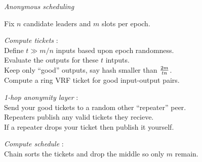 \documentclass{beamer}
\begin{document}
\begin{frame}[t]


\hspace{30pt} \emph{Anonymous scheduling} \\ \bigskip %

Fix $n$ candidate leaders and $m$ slots per epoch. \\ \smallskip

\emph{Compute tickets} : \\
\hspace{15pt} Define $t \gg m/n$ inputs based upon epoch randomness. \\ \smallskip
\hspace{15pt} Evaluate the outputs for these $t$ intputs. \\ \smallskip
\hspace{15pt} Keep only ``good'' outputs, say hash smaller than $2 m \over t n$.  \\ \smallskip
\hspace{15pt} Compute a ring VRF ticket for good input-output pairs. \\ \bigskip

\emph{1-hop anonymity layer} : \\
\hspace{5pt} Send your good tickets to a random other ``repeater'' peer. \\ \smallskip
\hspace{5pt} Repeaters publish any valid tickets they recieve. \\ \smallskip
\hspace{5pt} If a repeater drops your ticket then publish it yourself. \\ \bigskip

\emph{Compute schedule} : \\
\hspace{5pt} Chain sorts the tickets and drop the middle so only $m$ remain. \\ \bigskip

\end{frame}
\end{document}

